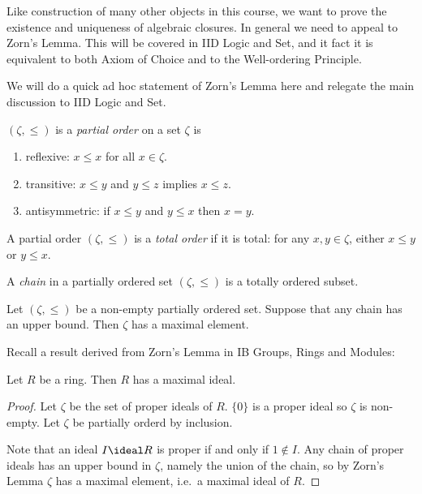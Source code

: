 \documentclass[a4paper]{article}
\begin{document}
Like construction of many other objects in this course, we want to prove the existence and uniqueness of algebraic closures. In general we need to appeal to Zorn's Lemma. This will be covered in IID Logic and Set, and it fact it is equivalent to both Axiom of Choice and to the Well-ordering Principle.

We will do a quick ad hoc statement of Zorn's Lemma here and relegate the main discussion to IID Logic and Set.

\begin{definition}
  \((\zeta, \leq)\) is a \emph{partial order} on a set \(\zeta\) is
  \begin{enumerate}
  \item reflexive: \(x \leq x\) for all \(x \in \zeta\).
  \item transitive: \(x \leq y\) and \(y \leq z\) implies \(x \leq z\).
  \item antisymmetric: if \(x \leq y\) and \(y \leq x\) then \(x = y\).
  \end{enumerate}
\end{definition}

\begin{definition}
  A partial order \((\zeta, \leq)\) is a \emph{total order} if it is total: for any \(x, y \in \zeta\), either \(x \leq y\) or \(y \leq x\).
\end{definition}

\begin{definition}[Chain]
  A \emph{chain} in a partially ordered set \((\zeta, \leq)\) is a totally ordered subset.
\end{definition}

\begin{theorem}
  Let \((\zeta, \leq)\) be a non-empty partially ordered set. Suppose that any chain has an upper bound. Then \(\zeta\) has a maximal element.
\end{theorem}

Recall a result derived from Zorn's Lemma in IB Groups, Rings and Modules:

\begin{lemma}
  Let \(R\) be a ring. Then \(R\) has a maximal ideal.
\end{lemma}

\begin{proof}
  Let \(\zeta\) be the set of proper ideals of \(R\). \(\{0\}\) is a proper ideal so \(\zeta\) is non-empty. Let \(\zeta\) be partially orderd by inclusion.

  Note that an ideal \(I \ideal R\) is proper if and only if \(1 \notin I\). Any chain of proper ideals has an upper bound in \(\zeta\), namely the union of the chain, so by Zorn's Lemma \(\zeta\) has a maximal element, i.e.\ a maximal ideal of \(R\).
\end{proof}
\end{document}
